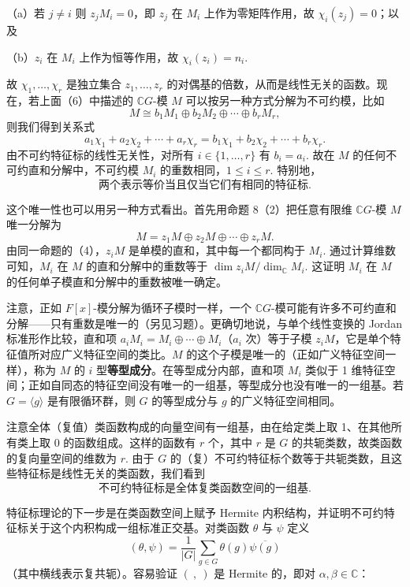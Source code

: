 （a）若 \(j \neq i\) 则 \(z_jM_i = 0\)，即 \(z_j\) 在 \(M_i\) 上作为零矩阵作用，故 \(\chi_i(z_j) = 0\)；以及

（b）\(z_i\) 在 \(M_i\) 上作为恒等作用，故 \(\chi_i(z_i) = n_i\).

故 \(\chi_1, \ldots, \chi_r\) 是独立集合 \(z_1, \ldots, z_r\) 的对偶基的倍数，从而是线性无关的函数。现在，若上面（6）中描述的 \(\mathbb{C}G\)-模 \(M\) 可以按另一种方式分解为不可约模，比如
\[
M \cong b_1M_1 \oplus b_2M_2 \oplus \cdots \oplus b_rM_r,
\]
则我们得到关系式
\[
a_1\chi_1+a_2\chi_2+\cdots+a_r\chi_r = b_1\chi_1+b_2\chi_2+\cdots+b_r\chi_r.
\]
由不可约特征标的线性无关性，对所有 \(i \in \{1, \ldots, r\}\) 有 \(b_i = a_i\). 故在 \(M\) 的任何不可约直和分解中，不可约模 \(M_i\) 的重数相同，\(1 \leq i \leq r\). 特别地，
\[
\text{两个表示等价当且仅当它们有相同的特征标}. \tag{18.9}
\]

这个唯一性也可以用另一种方式看出。首先用命题 8（2）把任意有限维 \(\mathbb{C}G\)-模 \(M\) 唯一分解为
\[
M = z_1M \oplus z_2M \oplus \cdots \oplus z_rM.
\]
由同一命题的（4），\(z_iM\) 是单模的直和，其中每一个都同构于 \(M_i\). 通过计算维数可知，\(M_i\) 在 \(M\) 的直和分解中的重数等于 \(\dim z_iM / \dim_{\mathbb C}M_i\). 这证明 \(M_i\) 在 \(M\) 的任何单子模直和分解中的重数被唯一确定。

注意，正如 \(F[x]\)-模分解为循环子模时一样，一个 \(\mathbb{C}G\)-模可能有许多不可约直和分解——只有重数是唯一的（另见习题）。更确切地说，与单个线性变换的 Jordan 标准形作比较，直和项 \(a_iM_i = M_i \oplus \cdots \oplus M_i\)（\(a_i\) 次）等于子模 \(z_iM\)，它是单个特征值所对应广义特征空间的类比。\(M\) 的这个子模是唯一的（正如广义特征空间一样），称为 \(M\) 的 \(i\) 型\textbf{等型成分}。在等型成分内部，直和项 \(M_i\) 类似于 1 维特征空间；正如自同态的特征空间没有唯一的一组基，等型成分也没有唯一的一组基。若 \(G = \langle g\rangle\) 是有限循环群，则 \(G\) 的等型成分与 \(g\) 的广义特征空间相同。

注意全体（复值）类函数构成的向量空间有一组基，由在给定类上取 1、在其他所有类上取 0 的函数组成。这样的函数有 \(r\) 个，其中 \(r\) 是 \(G\) 的共轭类数，故类函数的复向量空间的维数为 \(r\). 由于 \(G\) 的（复）不可约特征标个数等于共轭类数，且这些特征标是线性无关的类函数，我们看到
\[
\text{不可约特征标是全体复类函数空间的一组基}. \tag{18.10}
\]

特征标理论的下一步是在类函数空间上赋予 Hermite 内积结构，并证明不可约特征标关于这个内积构成一组标准正交基。对类函数 \(\theta\) 与 \(\psi\) 定义
\[
(\theta, \psi) = \frac{1}{|G|}\sum_{g \in G}\theta(g)\overline{\psi(g)}
\]
（其中横线表示复共轭）。容易验证 \((\ ,\ )\) 是 Hermite 的，即对 \(\alpha, \beta \in \mathbb{C}\)：

